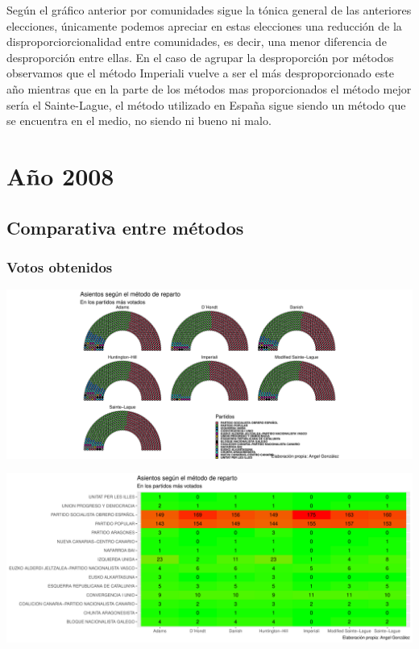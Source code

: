 \documentclass[12pt,a4paper,]{book}
\numberwithin{dummy}{section}
\theoremstyle{ocrenumbox}
\theoremstyle{blacknumex}
\theoremstyle{blacknumbox}
\theoremstyle{ocrenum}
\theoremstyle{ocrenum}
\begin{document}
Según el gráfico anterior por comunidades sigue la tónica general de las
anteriores elecciones, únicamente podemos apreciar en estas elecciones
una reducción de la disproporciorcionalidad entre comunidades, es decir,
una menor diferencia de desproporción entre ellas. En el caso de agrupar
la desproporción por métodos observamos que el método Imperiali vuelve a
ser el más desproporcionado este año mientras que en la parte de los
métodos mas proporcionados el método mejor sería el Sainte-Lague, el
método utilizado en España sigue siendo un método que se encuentra en el
medio, no siendo ni bueno ni malo.

\hypertarget{auxf1o-2008}{%
\section{Año 2008}\label{auxf1o-2008}}

\hypertarget{comparativa-entre-muxe9todos-9}{%
\subsection{Comparativa entre
métodos}\label{comparativa-entre-muxe9todos-9}}

\hypertarget{votos-obtenidos-9}{%
\subsubsection{Votos obtenidos}\label{votos-obtenidos-9}}

\begin{center}\includegraphics[width=0.95\linewidth]{figurasR/unnamed-chunk-143-1} \end{center}

\begin{center}\includegraphics[width=0.95\linewidth]{figurasR/unnamed-chunk-143-2} \end{center}
\end{document}
